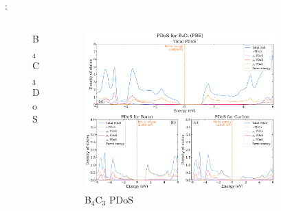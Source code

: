 \documentclass[xcolor=dvipsnames]{beamer}
\begin{document}
\begin{frame}{\insertsection: \insertsubsection}
\begin{columns}
\begin{column}{0.45\textwidth}
\begin{figure}
        \caption{B$_\text{4}$C$_\text{3}$ DoS}
    \end{figure}\end{column}
    \begin{column}{0.55\textwidth}\begin{figure}
        \includegraphics[width=0.8\textwidth]{PDoS/B4C3_pdos.png}
        \caption{B$_\text{4}$C$_\text{3}$ PDoS}
    \end{figure}\end{column}
\end{columns}
\end{frame}
\end{document}
